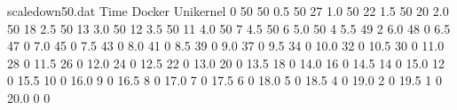 \begin{filecontents}{scaledown50.dat}
    Time	Docker	Unikernel
0	50	50
0.5	50	27
1.0	50	22
1.5	50	20
2.0	50	18
2.5	50	13
3.0	50	12
3.5	50	11
4.0	50	7
4.5	50	6
5.0	50	4
5.5	49	2
6.0	48	0
6.5	47	0
7.0	45	0
7.5	43	0
8.0	41	0
8.5	39	0
9.0	37	0
9.5	34	0
10.0	32	0
10.5	30	0
11.0	28	0
11.5	26	0
12.0	24	0
12.5	22	0
13.0	20	0
13.5	18	0
14.0	16	0
14.5	14	0
15.0	12	0
15.5	10	0
16.0	9	0
16.5	8	0
17.0	7	0
17.5	6	0
18.0	5	0
18.5	4	0
19.0	2	0
19.5	1	0
20.0	0	0
\end{filecontents}
